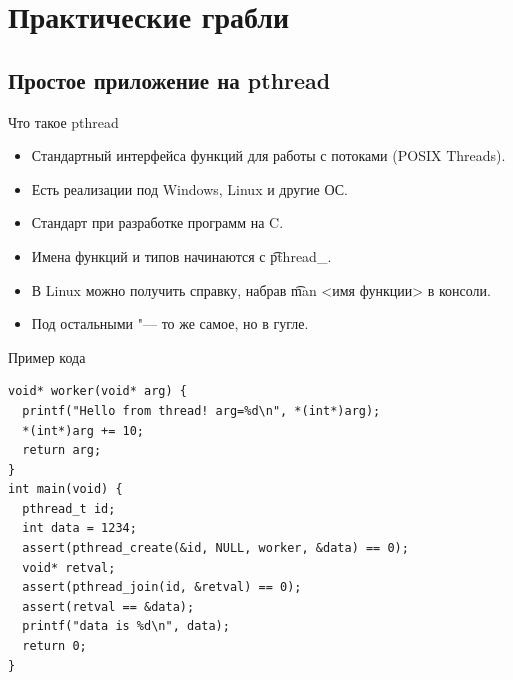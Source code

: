 \section{Практические грабли}
\subsection{Простое приложение на pthread}

\begin{frame}
\end{frame}

\begin{frame}{Что такое pthread}
	\begin{itemize}
		\item Стандартный интерфейса функций для работы с потоками (POSIX Threads).
		\item Есть реализации под Windows, Linux и другие ОС.
		\item Стандарт при разработке программ на C.
		\item Имена функций и типов начинаются с \t{pthread\_}.
		\item В Linux можно получить справку, набрав \t{man <имя функции>} в консоли.
		\item Под остальными "--- то же самое, но в гугле.
	\end{itemize}
\end{frame}

\begin{frame}[fragile]{Пример кода}
\begin{verbatim}
void* worker(void* arg) {
  printf("Hello from thread! arg=%d\n", *(int*)arg);
  *(int*)arg += 10;
  return arg;
}
int main(void) {
  pthread_t id;
  int data = 1234;
  assert(pthread_create(&id, NULL, worker, &data) == 0);
  void* retval;
  assert(pthread_join(id, &retval) == 0);
  assert(retval == &data);
  printf("data is %d\n", data);
  return 0;
}
\end{verbatim}
\end{frame}

